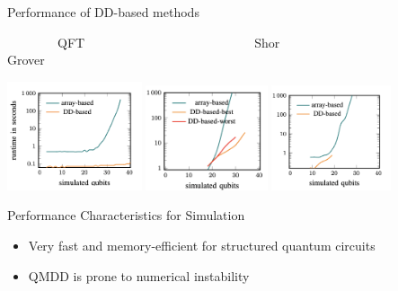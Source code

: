 \begin{refframe}{Performance of DD-based methods}
\centering

	~~~~~~~~QFT~~~~~~~~~~~~~~~~~~~~~~~~~~~Shor~~~~~~~~~~~~~~~~~~~~~~~~~~~~Grover\vspace{-1em}

	\includegraphics[height=3.2cm]{graphics/perf-qft}\hspace{-1em}
	\includegraphics[height=3.1cm]{graphics/perf-shor}\hspace{-1ex}	
	\includegraphics[height=3.1cm]{graphics/perf-grover}

\begin{alertblock}{Performance Characteristics for Simulation~\cite{grurl2020arrays}}
	\begin{itemize}
		\item Very fast and memory-efficient for structured quantum circuits
		\item QMDD is prone to numerical instability~\cite{niemann2020overcoming}
	\end{itemize}
\end{alertblock}

\vspace{-1em}

\end{refframe}













